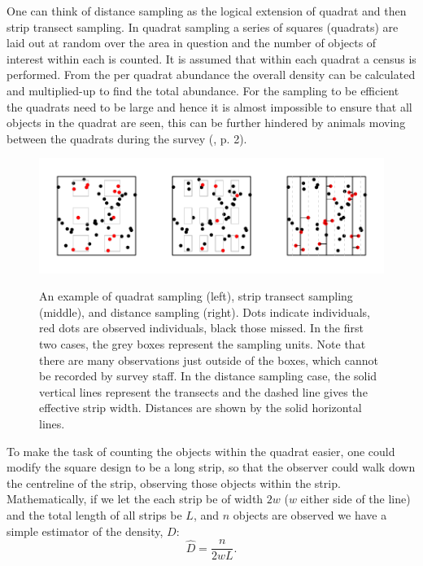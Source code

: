 One can think of distance sampling as the logical extension of quadrat and then strip transect sampling. In quadrat sampling a series of squares (quadrats) are laid out at random over the area in question and the number of objects of interest within each is counted. It is assumed that within each quadrat a census is performed. From the per quadrat abundance the overall density can be calculated and multiplied-up to find the total abundance. For the sampling to be efficient the quadrats need to be large and hence it is almost impossible to ensure that all objects in the quadrat are seen, this can be further hindered by animals moving between the quadrats during the survey (\cite{IDS}, p. 2).

\begin{figure}
\centering
\includegraphics{intro/figs/quadrat-to-ds.pdf}\\
\caption{An example of quadrat sampling (left), strip transect sampling (middle), and distance sampling (right). Dots indicate individuals, red dots are observed individuals, black those missed. In the first two cases, the grey boxes represent the sampling units. Note that there are many observations just outside of the boxes, which cannot be recorded by survey staff. In the distance sampling case, the solid vertical lines represent the transects and the dashed line gives the effective strip width. Distances are shown by the solid horizontal lines.}
\label{quad-to-ds}
\end{figure}

To make the task of counting the objects within the quadrat easier, one could modify the square design to be a long strip, so that the observer could walk down the centreline of the strip, observing those objects within the strip. Mathematically, if we let the each strip be of width $2w$ ($w$ either side of the line) and the total length of all strips be $L$, and $n$ objects are observed we have a simple estimator of the density, $D$:
\begin{equation}
\hat{D}=\frac{n}{2wL}.
\label{ds-simpleD}
\end{equation}

